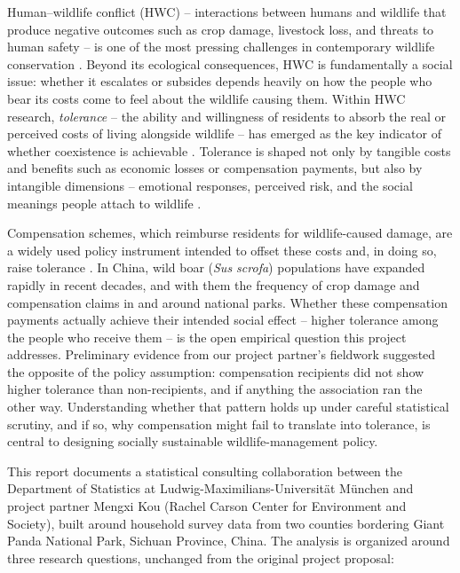 Human--wildlife conflict (HWC) -- interactions between humans and wildlife that
produce negative outcomes such as crop damage, livestock loss, and threats to
human safety -- is one of the most pressing challenges in contemporary wildlife
conservation \citep{Konig2020, Madden2004, Zimmermann2020}. Beyond its ecological
consequences, HWC is fundamentally a social issue: whether it escalates or
subsides depends heavily on how the people who bear its costs come to feel about
the wildlife causing them. Within HWC research, \emph{tolerance} -- the ability
and willingness of residents to absorb the real or perceived costs of living
alongside wildlife -- has emerged as the key indicator of whether coexistence is
achievable \citep{ExpositoGranados2019, KanskyKidd2024}. Tolerance is shaped not
only by tangible costs and benefits such as economic losses or compensation
payments, but also by intangible dimensions -- emotional responses, perceived
risk, and the social meanings people attach to wildlife
\citep{KanskyKnight2014}.

Compensation schemes, which reimburse residents for wildlife-caused damage, are
a widely used policy instrument intended to offset these costs and, in doing so,
raise tolerance \citep{Hemminger2025, Kichloo2023}. In China, wild boar (\emph{Sus
scrofa}) populations have expanded rapidly in recent decades, and with them the
frequency of crop damage and compensation claims in and around national parks.
Whether these compensation payments actually achieve their intended social
effect -- higher tolerance among the people who receive them -- is the open
empirical question this project addresses. Preliminary evidence from our project
partner's fieldwork suggested the opposite of the policy assumption:
compensation recipients did not show higher tolerance than non-recipients, and
if anything the association ran the other way. Understanding whether that
pattern holds up under careful statistical scrutiny, and if so, why compensation
might fail to translate into tolerance, is central to designing socially
sustainable wildlife-management policy.

This report documents a statistical consulting collaboration between the
Department of Statistics at Ludwig-Maximilians-Universit\"at M\"unchen and
project partner Mengxi Kou (Rachel Carson Center for Environment and Society),
built around household survey data from two counties bordering Giant Panda
National Park, Sichuan Province, China. The analysis is organized around three
research questions, unchanged from the original project proposal:


